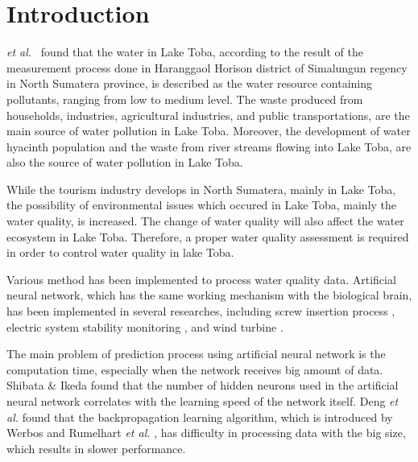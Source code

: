 \documentclass[journal,comsoc]{IEEEtran}
\begin{document}
\section{Introduction}
% 
% 
% 
% 
 {\it et al.} \cite{Haro13} \ found that the water in Lake Toba, according to the result of the measurement process done in Haranggaol Horison district of Simalungun regency in North Sumatera province, is described as the water resource containing pollutants, ranging from low to medium level. The waste produced from households, industries, agricultural industries, and public transportations, are the main source of water pollution in Lake Toba. Moreover, the development of water hyacinth population and the waste from river streams flowing into Lake Toba, are also the source of water pollution in Lake Toba.

While the tourism industry develops in North Sumatera, mainly in Lake Toba, the possibility of environmental issues which occured in Lake Toba, mainly the water quality, is increased. The change of water quality will also affect the water ecosystem in Lake Toba. Therefore, a proper water quality assessment is required in order to control water quality in lake Toba.

Various method has been implemented to process water quality data. Artificial neural network, which has the same working mechanism with the biological brain, has been implemented in several researches, including screw insertion process \cite{Lara99}, electric system stability monitoring \cite{Popovic98}, and wind turbine \cite{Ata15}.

The main problem of prediction process using artificial neural network is the computation time, especially when the network receives big amount of data. Shibata \& Ikeda \cite{Shibata09} found that the number of hidden neurons used in the artificial neural network correlates with the learning speed of the network itself. Deng \textit{et al.} \cite{Deng15} found that the backpropagation learning algorithm, which is introduced by Werbos \cite{Werbos74} and Rumelhart \textit{et al.} \cite{Rumelhart86}, has difficulty in processing data with the big size, which results in slower performance.
\end{document}
